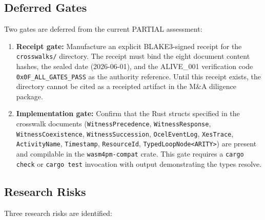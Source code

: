 \subsection{Deferred Gates}
\label{sec:crosswalks-openq-deferred}

Two gates are deferred from the current PARTIAL assessment:

\begin{enumerate}
  \item \textbf{Receipt gate:} Manufacture an explicit \textsc{BLAKE3}-signed receipt for the
        \texttt{crosswalks/} directory. The receipt must bind the eight document content hashes,
        the sealed date (2026-06-01), and the \textsc{ALIVE\_001} verification code
        \texttt{0x0F\_ALL\_GATES\_PASS} as the authority reference. Until this receipt exists,
        the directory cannot be cited as a receipted artifact in the M\&A diligence package.

  \item \textbf{Implementation gate:} Confirm that the Rust structs specified in the crosswalk
        documents (\texttt{WitnessPrecedence}, \texttt{WitnessResponse},
        \texttt{WitnessCoexistence}, \texttt{WitnessSuccession}, \texttt{OcelEventLog},
        \texttt{XesTrace}, \texttt{ActivityName}, \texttt{Timestamp}, \texttt{ResourceId},
        \texttt{TypedLoopNode<ARITY>}) are present and compilable in the
        \texttt{wasm4pm-compat} crate. This gate requires a \texttt{cargo check} or
        \texttt{cargo test} invocation with output demonstrating the types resolve.
\end{enumerate}

\subsection{Research Risks}
\label{sec:crosswalks-openq-risks}

Three research risks are identified:


